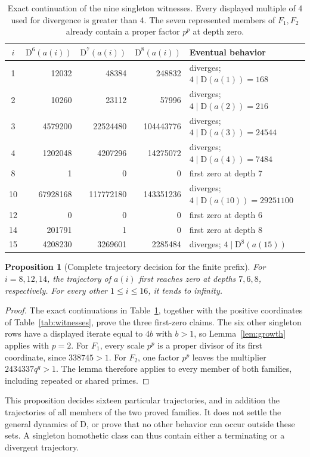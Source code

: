 \documentclass[11pt,a4paper]{article}
\newcommand{\D}{\mathrm{D}}
\newtheorem{proposition}[theorem]{Proposition}
\theoremstyle{definition}
\theoremstyle{remark}
\begin{document}
\begin{table}[htbp]
\centering\small
\begin{tabular}{crrrl}
\toprule
$i$ & $\D^6(a(i))$ & $\D^7(a(i))$ & $\D^8(a(i))$ & Eventual behavior\\
\midrule
1&12032&48384&248832&diverges; $4\mid\D(a(1))=168$\\
2&10260&23112&57996&diverges; $4\mid\D(a(2))=216$\\
3&4579200&22524480&104443776&diverges; $4\mid\D(a(3))=24544$\\
4&1202048&4207296&14275072&diverges; $4\mid\D(a(4))=7484$\\
8&1&0&0&first zero at depth 7\\
10&67928168&117772180&143351236&diverges; $4\mid\D(a(10))=29251100$\\
12&0&0&0&first zero at depth 6\\
14&201791&1&0&first zero at depth 8\\
15&4208230&3269601&2285484&diverges; $4\mid\D^8(a(15))$\\
\bottomrule
\end{tabular}
\caption{Exact continuation of the nine singleton witnesses. Every displayed
multiple of 4 used for divergence is greater than 4. The seven represented
members of $F_1,F_2$ already contain a proper factor $p^p$ at depth zero.}
\label{tab:dynamics}
\end{table}

\begin{proposition}[Complete trajectory decision for the finite prefix]\label{prop:dynamics}
For $i=8,12,14$, the trajectory of $a(i)$ first reaches zero at depths
$7,6,8$, respectively. For every other $1\le i\le16$, it tends to infinity.
\end{proposition}
\begin{proof}
The exact continuations in Table~\ref{tab:dynamics}, together with the
positive coordinates of Table~\ref{tab:witnesses}, prove the three first-zero
claims. The six other singleton rows have a displayed iterate equal to
$4b$ with $b>1$, so Lemma~\ref{lem:growth} applies with $p=2$.
For $F_1$, every scale $p^p$ is a proper divisor of its first coordinate,
since $338745>1$. For $F_2$, one factor $p^p$ leaves the multiplier
$2434337q^q>1$. The lemma therefore applies to every member of both
families, including repeated or shared primes.
\end{proof}

This proposition decides sixteen particular trajectories, and in addition
the trajectories of all members of the two proved families. It does not
settle the general dynamics of $\D$, or prove that no other behavior can
occur outside these sets. A singleton homothetic class can thus contain
either a terminating or a divergent trajectory.
\end{document}
